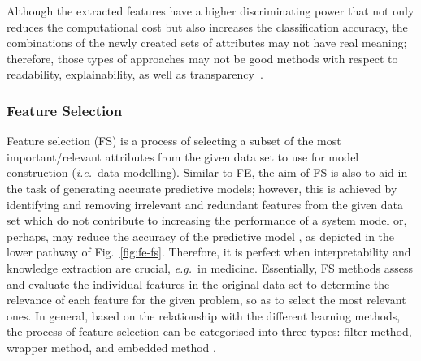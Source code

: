 \documentclass{article}
\newcommand{\zzie}{\emph{i.e.}~}
\newcommand{\zzeg}{\emph{e.g.}~}
\newcommand*{\1}{\textcolor{magenta}}
\begin{document}
	Although the extracted features have a higher discriminating power that not only reduces the computational cost but also increases the classification accuracy, the combinations of the newly created sets of attributes may not have real meaning; therefore, those types of approaches may not be good methods with respect to readability, explainability, as well as transparency~\cite{remeseiro2019review}. 
	
	\subsubsection{Feature Selection}\label{sec:fs}
	Feature selection (FS) is a process of selecting a subset of the most important/relevant attributes from the given data set to use for model construction (\zzie data modelling). Similar to FE, the aim of FS is also to aid in the task of generating accurate predictive models; however, this is achieved by identifying and removing irrelevant and redundant features from the given data set which do not contribute to increasing the performance of a system model or, perhaps, may reduce the accuracy of the predictive model \cite{zuo2018grooming}, as depicted in the lower pathway of Fig.~\ref{fig:fe-fs}. Therefore, it is perfect when interpretability and knowledge extraction are crucial, \zzeg in medicine. Essentially, FS methods assess and evaluate the individual features in the original data set to determine the relevance of each feature for the given problem, so as to select the most relevant ones. In general, based on the relationship with the different learning methods, the process of feature selection can be categorised into three types: filter method, wrapper method, and embedded method \cite{liang2017text}. 
	
\end{document}
